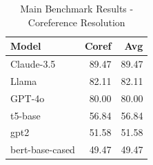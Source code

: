 \begin{table}[htbp]
\centering
\caption{Main Benchmark Results - Coreference Resolution}
\label{tab:coref_main_results}
\begin{tabular}{lrr}
\toprule
Model & Coref & \textbf{Avg} \\
\midrule
Claude-3.5 & 89.47 & 89.47 \\
Llama & 82.11 & 82.11 \\
GPT-4o & 80.00 & 80.00 \\
t5-base & 56.84 & 56.84 \\
gpt2 & 51.58 & 51.58 \\
bert-base-cased & 49.47 & 49.47 \\
\bottomrule
\end{tabular}
\end{table}
